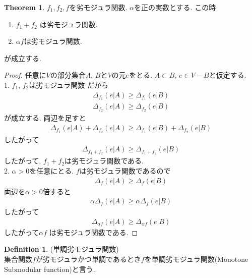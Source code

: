 \documentclass[11pt, a4paper, dvipdfmx]{jsbook}
\theoremstyle{definition}
\newtheorem{Definition+}[Axiom+]{Definition}
\newtheorem{Theorem+}[Axiom+]{Theorem}
\begin{document}
\begin{Theorem+}
  $f_{1}, f_{2}, f$を劣モジュラ関数. $\alpha$を正の実数とする. この時
  \begin{enumerate}
      \item $f_{1} + f_{2} $ は劣モジュラ関数.
      \item $\alpha f$は劣モジュラ関数.
  \end{enumerate}
  が成立する.
  \begin{proof}
      任意に$V$の部分集合$A$, $B$と$V$の元$e$をとる. $A\subset B$, $e\in V - B$と仮定する.\\
      1. $f_{1}$, $f_{2}$は劣モジュラ関数 だから
      \begin{align*}
          \Delta_{f_{1}}(e|A)\geq \Delta_{f_{1}}(e|B)
      \end{align*}
      \begin{align*}
          \Delta_{f_{2}}(e|A)\geq \Delta_{f_{2}}(e|B)
      \end{align*}
      が成立する. 両辺を足すと
      \begin{align*}
          \Delta_{f_{1}}(e|A) + \Delta_{f_{2}}(e|A)\geq \Delta_{f_{1}}(e|B) + \Delta_{f_{2}}(e|B)
      \end{align*}
      したがって
      \begin{align*}
          \Delta_{f_{1} + f_{2}}(e|A)\geq \Delta_{f_{1} + f_{2}}(e|B)
      \end{align*}
      したがって, $f_{1} + f_{2}$は劣モジュラ関数である.\\
      2. $\alpha > 0$を任意にとる. $f$は劣モジュラ関数であるので
      \begin{align*}
          \Delta_{f}(e|A)\geq \Delta_{f}(e|B)
      \end{align*}
      両辺を$\alpha > 0$倍すると
      \begin{align*}
          \alpha\Delta_{f}(e|A)\geq \alpha\Delta_{f}(e|B)
      \end{align*}
      したがって
      \begin{align*}
          \Delta_{\alpha f}(e|A)\geq \Delta_{\alpha f}(e|B)
      \end{align*}
      したがって$\alpha f$ は劣モジュラ関数である.
   \end{proof}
\end{Theorem+}
\begin{Definition+}(単調劣モジュラ関数)\\
  集合関数$f$が劣モジュラかつ単調であるとき$f$を単調劣モジュラ関数(Monotone Submodular function)と言う.
\end{Definition+}
\end{document}
